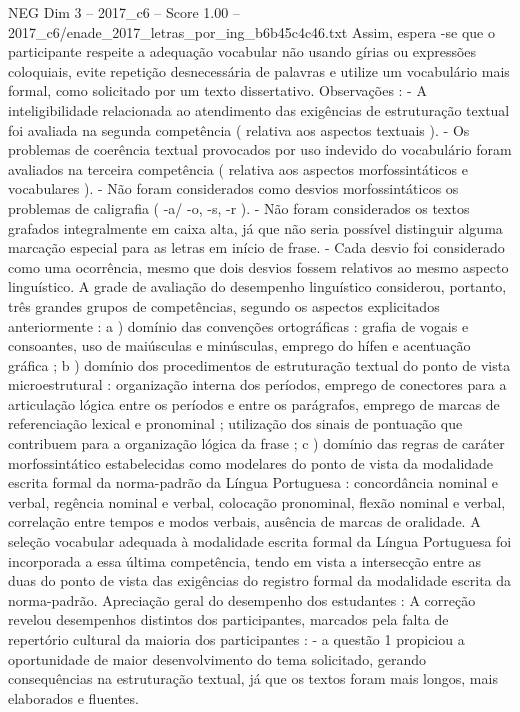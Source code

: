 \begin{textsample}{NEG Dim 3 – 2017\_c6 – Score 1.00 – 2017\_c6/enade\_2017\_letras\_por\_ing\_b6b45c4c46.txt}
Assim, espera -se que o participante respeite a adequação vocabular não usando gírias ou expressões coloquiais, evite repetição desnecessária de palavras e utilize um vocabulário mais formal, como solicitado por um texto dissertativo.
Observações : - A inteligibilidade relacionada ao atendimento das exigências de estruturação textual foi avaliada na segunda competência ( relativa aos aspectos textuais ). - Os problemas de coerência textual provocados por uso indevido do vocabulário foram avaliados na terceira competência ( relativa aos aspectos morfossintáticos e vocabulares ). - Não foram considerados como desvios morfossintáticos os problemas de caligrafia ( -a/ -o, -s, -r ). - Não foram considerados os textos grafados integralmente em caixa alta, já que não seria possível distinguir alguma marcação especial para as letras em início de frase. - Cada desvio foi considerado como uma ocorrência, mesmo que dois desvios fossem relativos ao mesmo aspecto linguístico.
A grade de avaliação do desempenho linguístico considerou, portanto, três grandes grupos de competências, segundo os aspectos explicitados anteriormente : a ) domínio das convenções ortográficas : grafia de vogais e consoantes, uso de maiúsculas e minúsculas, emprego do hífen e acentuação gráfica ; b ) domínio dos procedimentos de estruturação textual do ponto de vista microestrutural : organização interna dos períodos, emprego de conectores para a articulação lógica entre os períodos e entre os parágrafos, emprego de marcas de referenciação lexical e pronominal ; utilização dos sinais de pontuação que contribuem para a organização lógica da frase ; c ) domínio das regras de caráter morfossintático estabelecidas como modelares do ponto de vista da modalidade escrita formal da norma-padrão da Língua Portuguesa : concordância nominal e verbal, regência nominal e verbal, colocação pronominal, flexão nominal e verbal, correlação entre tempos e modos verbais, ausência de marcas de oralidade.
A seleção vocabular adequada à modalidade escrita formal da Língua Portuguesa foi incorporada a essa última competência, tendo em vista a intersecção entre as duas do ponto de vista das exigências do registro formal da modalidade escrita da norma-padrão.
Apreciação geral do desempenho dos estudantes : A correção revelou desempenhos distintos dos participantes, marcados pela falta de repertório cultural da maioria dos participantes : - a questão 1 propiciou a oportunidade de maior desenvolvimento do tema solicitado, gerando consequências na estruturação textual, já que os textos foram mais longos, mais elaborados e fluentes.

\end{textsample}
